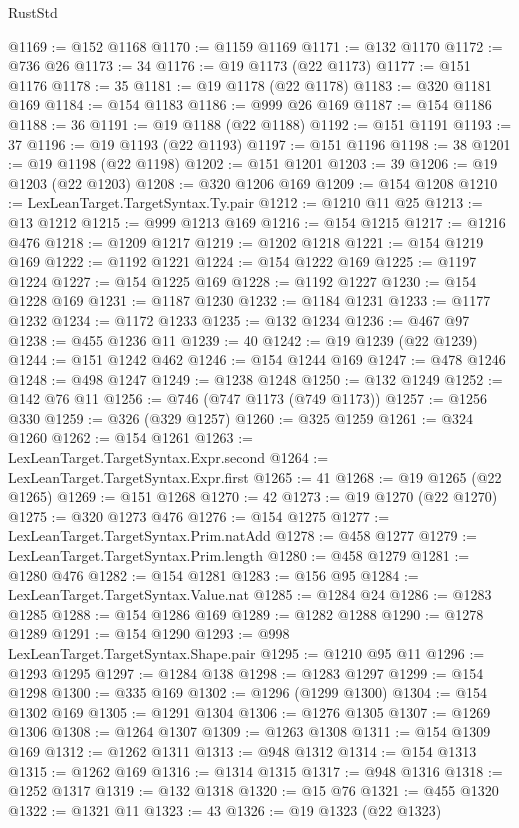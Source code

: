 \begin{lexlean}{RustStd}
\begin{coremodule}
@1169 := @152 @1168
@1170 := @1159 @1169
@1171 := @132 @1170
@1172 := @736 @26
@1173 := 34
@1176 := @19 @1173 (@22 @1173)
@1177 := @151 @1176
@1178 := 35
@1181 := @19 @1178 (@22 @1178)
@1183 := @320 @1181 @169
@1184 := @154 @1183
@1186 := @999 @26 @169
@1187 := @154 @1186
@1188 := 36
@1191 := @19 @1188 (@22 @1188)
@1192 := @151 @1191
@1193 := 37
@1196 := @19 @1193 (@22 @1193)
@1197 := @151 @1196
@1198 := 38
@1201 := @19 @1198 (@22 @1198)
@1202 := @151 @1201
@1203 := 39
@1206 := @19 @1203 (@22 @1203)
@1208 := @320 @1206 @169
@1209 := @154 @1208
@1210 := LexLeanTarget.TargetSyntax.Ty.pair
@1212 := @1210 @11 @25
@1213 := @13 @1212
@1215 := @999 @1213 @169
@1216 := @154 @1215
@1217 := @1216 @476
@1218 := @1209 @1217
@1219 := @1202 @1218
@1221 := @154 @1219 @169
@1222 := @1192 @1221
@1224 := @154 @1222 @169
@1225 := @1197 @1224
@1227 := @154 @1225 @169
@1228 := @1192 @1227
@1230 := @154 @1228 @169
@1231 := @1187 @1230
@1232 := @1184 @1231
@1233 := @1177 @1232
@1234 := @1172 @1233
@1235 := @132 @1234
@1236 := @467 @97
@1238 := @455 @1236 @11
@1239 := 40
@1242 := @19 @1239 (@22 @1239)
@1244 := @151 @1242 @462
@1246 := @154 @1244 @169
@1247 := @478 @1246
@1248 := @498 @1247
@1249 := @1238 @1248
@1250 := @132 @1249
@1252 := @142 @76 @11
@1256 := @746 (@747 @1173 (@749 @1173))
@1257 := @1256 @330
@1259 := @326 (@329 @1257)
@1260 := @325 @1259
@1261 := @324 @1260
@1262 := @154 @1261
@1263 := LexLeanTarget.TargetSyntax.Expr.second
@1264 := LexLeanTarget.TargetSyntax.Expr.first
@1265 := 41
@1268 := @19 @1265 (@22 @1265)
@1269 := @151 @1268
@1270 := 42
@1273 := @19 @1270 (@22 @1270)
@1275 := @320 @1273 @476
@1276 := @154 @1275
@1277 := LexLeanTarget.TargetSyntax.Prim.natAdd
@1278 := @458 @1277
@1279 := LexLeanTarget.TargetSyntax.Prim.length
@1280 := @458 @1279
@1281 := @1280 @476
@1282 := @154 @1281
@1283 := @156 @95
@1284 := LexLeanTarget.TargetSyntax.Value.nat
@1285 := @1284 @24
@1286 := @1283 @1285
@1288 := @154 @1286 @169
@1289 := @1282 @1288
@1290 := @1278 @1289
@1291 := @154 @1290
@1293 := @998 LexLeanTarget.TargetSyntax.Shape.pair
@1295 := @1210 @95 @11
@1296 := @1293 @1295
@1297 := @1284 @138
@1298 := @1283 @1297
@1299 := @154 @1298
@1300 := @335 @169
@1302 := @1296 (@1299 @1300)
@1304 := @154 @1302 @169
@1305 := @1291 @1304
@1306 := @1276 @1305
@1307 := @1269 @1306
@1308 := @1264 @1307
@1309 := @1263 @1308
@1311 := @154 @1309 @169
@1312 := @1262 @1311
@1313 := @948 @1312
@1314 := @154 @1313
@1315 := @1262 @169
@1316 := @1314 @1315
@1317 := @948 @1316
@1318 := @1252 @1317
@1319 := @132 @1318
@1320 := @15 @76
@1321 := @455 @1320
@1322 := @1321 @11
@1323 := 43
@1326 := @19 @1323 (@22 @1323)

\end{coremodule}
\end{lexlean}
